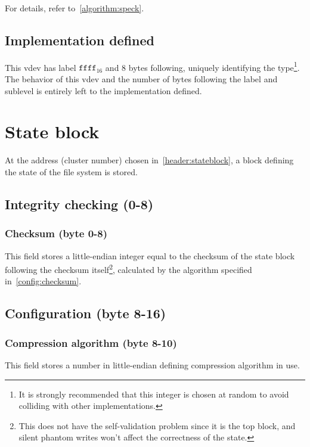 \documentclass[11pt,a4paper]{report}
\begin{document}
        For details, refer to~\ref{algorithm:speck}.


        \section{Implementation defined}
        This vdev has label $\texttt{ffff}_{16}$ and 8 bytes following, uniquely
        identifying the type\footnote{It is strongly recommended that this
        integer is chosen at random to avoid colliding with other
        implementations.}. The behavior of this vdev and the number of bytes
        following the label and sublevel is entirely left to the implementation
        defined.

    \chapter{State block}
    \label{stateblock}
    At the address (cluster number) chosen in~\ref{header:stateblock}, a block
    defining the state of the file system is stored.

    \section{Integrity checking (0-8)}
        \subsection{Checksum (byte 0-8)}
        This field stores a little-endian integer equal to the checksum of the
        state block following the checksum itself\footnote{This does not have
        the self-validation problem since it is the top block, and silent
        phantom writes won't affect the correctness of the state.}, calculated
        by the algorithm specified in~\ref{config:checksum}.

    \section{Configuration (byte 8-16)}
        \subsection{Compression algorithm (byte 8-10)}
        \label{config:compression}
        This field stores a number in little-endian defining compression
        algorithm in use.
\end{document}
